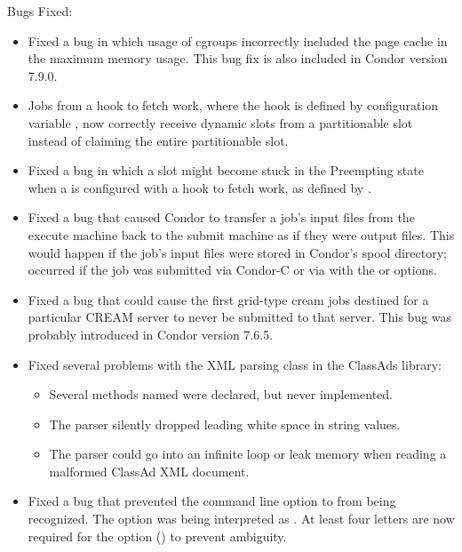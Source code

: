 \noindent Bugs Fixed:

\begin{itemize}

\item Fixed a bug in which usage of cgroups incorrectly included the
page cache in the maximum memory usage.
This bug fix is also included in Condor version 7.9.0.

\item Jobs from a hook to fetch work, 
where the hook is defined by configuration variable 
,
now correctly receive dynamic slots from a partitionable slot 
instead of claiming the entire partitionable slot.

\item Fixed a bug in which a slot might become stuck in the Preempting state
when a  is configured with a hook to fetch work,
as defined by .

\item Fixed a bug that caused Condor to transfer a job's input files from
the execute machine back to the submit machine as if they were output files.
This would happen if the
job's input files were stored in Condor's spool directory;
occurred if the job was submitted via Condor-C or via 
 with the  or  options.

\item Fixed a bug that could cause the first grid-type cream jobs destined 
for a particular CREAM server to never be submitted to that server.
This bug was probably introduced in Condor version 7.6.5.

\item Fixed several problems with the XML parsing class
 in the ClassAds library:
  \begin{itemize}
  \item Several methods named  were declared, 
  but never implemented. 
  \item The parser silently dropped leading white space in string values.
  \item The parser could go into an infinite loop or leak memory when
    reading a malformed ClassAd XML document. 
  \end{itemize}

\item Fixed a bug that prevented the  command line option to
 from being recognized.
The  option was being interpreted as . 
At least four letters are now required for the  option
() to prevent ambiguity.


\end{itemize}
